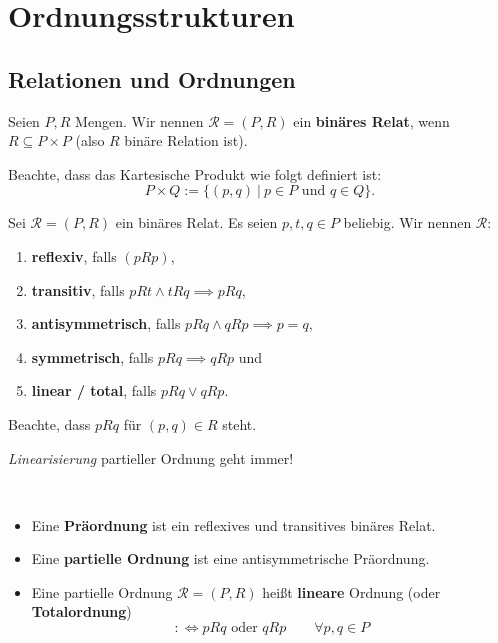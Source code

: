 
\chapter{Ordnungsstrukturen}
\section{Relationen und Ordnungen}

\renewcommand{\|}{~|~}
\begin{definition}
    Seien $P,R$ Mengen. Wir nennen $\mathscr{R} = (P,R)$ ein \textbf{binäres Relat}, 
    wenn $R \subseteq P \times P$ (also $R$ binäre Relation ist).

    Beachte, dass das Kartesische Produkt wie folgt definiert ist:
    $$ P \times Q := \{(p,q) \| p \in P \textrm{ und } q \in Q\}.$$
\end{definition}

\begin{definition}
    Sei $\mathscr{R} = (P,R)$ ein binäres Relat. Es seien $p,t,q \in P$ beliebig.
    Wir nennen $\mathscr{R}$:
    \begin{enumerate}[label=(\arabic*)]
        \item \textbf{reflexiv}, falls $(pRp)$,
        \item \textbf{transitiv}, falls $pRt \land tRq \implies pRq$,
        \item \textbf{antisymmetrisch}, falls $pRq \land qRp \implies p=q$,
        \item \textbf{symmetrisch}, falls $pRq \implies qRp$ und
        \item \textbf{linear / total}, falls $pRq\vee qRp$.
    \end{enumerate}

    Beachte, dass $pRq$ für $(p,q) \in R$ steht.
\end{definition}

\textit{Linearisierung} partieller Ordnung geht immer!

\begin{definition}\
\begin{itemize}
\item Eine \textbf{Präordnung} ist ein reflexives und transitives binäres Relat.
\item Eine \textbf{partielle Ordnung} ist eine antisymmetrische Präordnung.
\item Eine partielle Ordnung $\mathscr{R} = (P,R)$ heißt \textbf{lineare} Ordnung (oder \textbf{Totalordnung})
     $$:\Longleftrightarrow pRq \textrm{ oder } qRp\qquad\forall p,q \in P$$
\end{itemize}
\end{definition}


